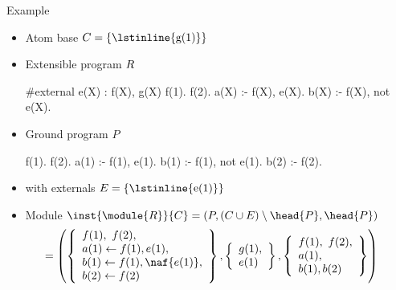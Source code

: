 \begin{frame}[fragile]{Example}
  \begin{itemize}
  \item<1-> Atom base $C=\{\text{\lstinline{g(1)}}\}$
  \item<only@1,4> Extensible program $R$
    \begin{semiverbatim}
  #external e(X) : f(X), g(X)
  f(1). f(2).
  a(X) :- f(X), e(X).
  b(X) :- f(X), not e(X).
    \end{semiverbatim}
    \vspace{-10pt}
  \item<only@2-3> Ground program $P$
    \begin{semiverbatim}
  f(1). f(2).
  a(1) :- f(1), e(1).
  b(1) :- f(1), not e(1).   b(2) :- f(2).
    \end{semiverbatim}
    \vspace{-13pt}
  \item<only@2-3>[] with externals $E=\{\text{\lstinline{e(1)}}\}$
  \item<3-> Module
    \(
    \inst{\module{\RRG}}{C}=(P,(C\cup E)\setminus\head{P},\head{P})
    \)
    \[
    \hspace{-15pt}
    {} =
    \left(
      \left\{
        \begin{array}{l}
          f(1), \  f(2), \\
          a(1) \leftarrow f(1), e(1),\\
          b(1) \leftarrow f(1), \naf{e(1)},\\
          b(2) \leftarrow f(2)
        \end{array}
      \right\}
      ,
      \left\{
        \begin{array}[l]{l}
          g(1),\\e(1)
        \end{array}
      \right\}
      ,
      \left\{
        \begin{array}[l]{l}
          f(1), \  f(2), \\
          a(1),\\
          b(1), b(2)
        \end{array}
      \right\}
    \right)
    \]
  \end{itemize}
\end{frame}
